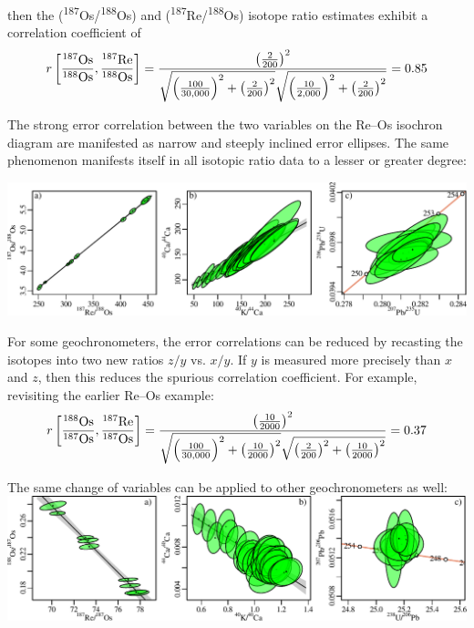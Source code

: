 \begin{refsection}
\noindent then the (\textsuperscript{187}Os/\textsuperscript{188}Os)
and (\textsuperscript{187}Re/\textsuperscript{188}Os) isotope ratio
estimates exhibit a correlation coefficient of
\[
  \noindent r\left[\frac{{}^{187}\mbox{Os}}{{}^{188}\mbox{Os}},
                   \frac{{}^{187}\mbox{Re}}{{}^{188}\mbox{Os}}\right]
  =
  \frac{
    \left(\frac{2}{200}\right)^2
  }{
    \sqrt{\left(\frac{100}{30,000}\right)^2 +
      \left(\frac{2}{200}\right)^2}
    \sqrt{\left(\frac{10}{2,000}\right)^2 +
      \left(\frac{2}{200}\right)^2}
  }
  = 0.85
\]

The strong error correlation between the two variables on the Re--Os
isochron diagram are manifested as narrow and steeply inclined error
ellipses. The same phenomenon manifests itself in all isotopic ratio
data to a lesser or greater degree:

\noindent\includegraphics[width=\textwidth]{../figures/errorcorrelation_edited.pdf}
\begingroup
{}
\label{fig:errorcorrelation}
\endgroup

For some geochronometers, the error correlations can be reduced by
recasting the isotopes into two new ratios $z/y$ vs. $x/y$. If $y$ is
measured more precisely than $x$ and $z$, then this reduces the
spurious correlation coefficient. For example, revisiting the earlier
Re--Os example:
\[
  \noindent r\left[\frac{{}^{188}\mbox{Os}}{{}^{187}\mbox{Os}},
                   \frac{{}^{187}\mbox{Re}}{{}^{187}\mbox{Os}}\right]
  =
  \frac{
    \left(\frac{10}{2000}\right)^2
  }{
    \sqrt{\left(\frac{100}{30,000}\right)^2 +
      \left(\frac{10}{2000}\right)^2}
    \sqrt{\left(\frac{2}{200}\right)^2 +
      \left(\frac{10}{2000}\right)^2}
  }
  = 0.37
\]

The same change of variables can be applied to other geochronometers
as well:\\

\noindent\includegraphics[width=\textwidth]{../figures/inverrorcorrelation_edited.pdf}
\begingroup
{}
\label{fig:inverrorcorrelation}
\endgroup


\end{refsection}
